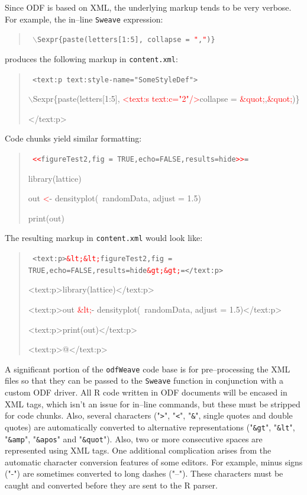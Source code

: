 \documentclass[12pt]{article}
\begin{document}
Since ODF is based on XML, the underlying markup tends to be very verbose. For example, the in--line \texttt{Sweave} expression:
\begin{quote}
{\tt \footnotesize
$\backslash$Sexpr\{paste(letters[1:5],   collapse = \textcolor{red}{"},\textcolor{red}{"})\}
}
\end{quote}
produces the following markup in \texttt{content.xml}:
\begin{quote}
{\tt \footnotesize
<text:p text:style-name="SomeStyleDef">

  $\backslash$Sexpr\{paste(letters[1:5], \textcolor{red}{<text:s text:c="2"/>}collapse = \textcolor{red}{\&quot;},\textcolor{red}{\&quot;})\} 
  
</text:p>
}
\end{quote}
Code chunks yield similar formatting:
\begin{quote}
{\tt \footnotesize
\textcolor{red}{<<}figureTest2,fig = TRUE,echo=FALSE,results=hide\textcolor{red}{>>}=

library(lattice)

out \textcolor{red}{<}- densityplot(~randomData, adjust = 1.5)

print(out)

}
\end{quote}
The resulting markup in \texttt{content.xml} would look like:
\begin{quote}
{\tt \footnotesize
<text:p>\textcolor{red}{\&lt;\&lt;}figureTest2,fig = TRUE,echo=FALSE,results=hide\textcolor{red}{\&gt;\&gt;}=</text:p>

<text:p>library(lattice)</text:p>

<text:p>out \textcolor{red}{\&lt;}- densityplot(~randomData, adjust = 1.5)</text:p>

<text:p>print(out)</text:p>

<text:p>@</text:p>}
\end{quote}

A significant portion of the \texttt{odfWeave} code base is for pre--processing the XML files so that they can be passed to the \texttt{Sweave} function in conjunction with a custom ODF driver. All R code written in ODF documents will be encased in XML tags, which isn't an issue for in--line commands, but these must be stripped for code chunks. Also, several characters ("\texttt{>}", "\texttt{<}", "\texttt{\&}", single quotes and double quotes) are automatically converted to alternative representations ("\texttt{\&gt}", "\texttt{\&lt}", "\texttt{\&amp}", "\texttt{\&apos}" and "\texttt{\&quot}"). Also, two or more consecutive spaces are represented using XML tags. One additional complication arises from the automatic character conversion features of some editors. For example, minus signs ("-") are sometimes converted to long dashes ("--"). These characters must be caught and converted before they are sent to the R parser. 
\end{document}
